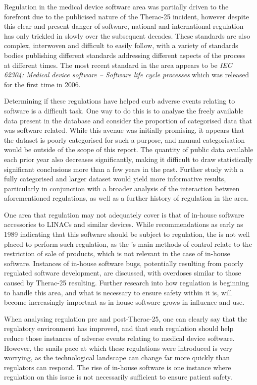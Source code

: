 \documentclass{cshonours}
\newcommand{\ther}{Therac-25\xspace}
\begin{document}
Regulation in the medical device software area was partially driven to the forefront due to the publicised nature of the \ther incident, however despite this clear and present danger of software, national and international regulation has only trickled in slowly over the subsequent decades. These standards are also complex, interwoven and difficult to easily follow, with a variety of standards bodies publishing different standards addressing different aspects of the process at different times. The most recent standard in the area appears to be \textit{IEC 62304: Medical device software -- Software life cycle processes} which was released for the first time in 2006. 

Determining if these regulations have helped curb adverse events relating to software is a difficult task. One way to do this is to analyse the freely available data present in the \fda \maude database and consider the proportion of categorised data that was software related. While this avenue was initially promising, it appears that the dataset is poorly categorised for such a purpose, and manual categorisation would be outside of the scope of this report. The quantity of public data available each prior year also decreases significantly, making it difficult to draw statistically significant conclusions more than a few years in the past. Further study with a fully categorised and larger dataset would yield more informative results, particularly in conjunction with a broader analysis of the interaction between aforementioned regulations, as well as a further history of \fda regulation in the area.

One area that regulation may not adequately cover is that of in-house software accessories to LINACs and similar devices. While \fda recommendations as early as 1989 indicating that this software should be subject to regulation, the \fda is not well placed to perform such regulation, as the \fda's main methods of control relate to the restriction of sale of products, which is not relevant in the case of in-house software. Instances of in-house software bugs, potentially resulting from poorly regulated software development, are discussed, with overdoses similar to those caused by \ther resulting. Further research into how regulation is beginning to handle this area, and what is necessary to ensure safety within it is, will become increasingly important as in-house software grows in influence and use.

When analysing regulation pre and post-\ther, one can clearly say that the regulatory environment has improved, and that such regulation should help reduce those instances of adverse events relating to medical device software. However, the snails pace at which these regulations were introduced is very worrying, as the technological landscape can change far more quickly than regulators can respond. The rise of in-house software is one instance where regulation on this issue is not necessarily sufficient to ensure patient safety.
\end{document}
